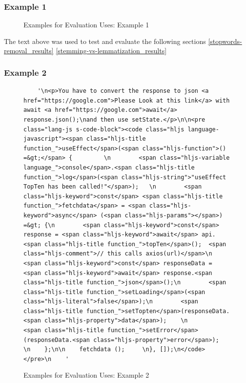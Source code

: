 \subsubsection{Example 1} \label{example-1}
\begin{figure}[H]
  \noindent{}
  \caption{Examples for Evaluation Uses: Example 1}
  \label{fig:example-1}
\end{figure}

\noindent The text above was used to test and evaluate the following sections \ref{stopwords-removal_results} \ref{stemming-vs-lemmatization_results}

\newpage
\subsubsection{Example 2} \label{example-2}
\hspace{0.5cm}
\begin{figure}[H]
  \begin{lstlisting}
    '\n<p>You have to convert the response to json <a href="https://google.com">Please Look at this link</a> with await <a href="https://google.com">await</a> response.json();\nand then use setState.</p>\n\n<pre class="lang-js s-code-block"><code class="hljs language-javascript"><span class="hljs-title function_">useEffect</span>(<span class="hljs-function">() =&gt;</span> {         \n        <span class="hljs-variable language_">console</span>.<span class="hljs-title function_">log</span>(<span class="hljs-string">"useEffect TopTen has been called!"</span>);   \n        <span class="hljs-keyword">const</span> <span class="hljs-title function_">fetchdata</span> = <span class="hljs-keyword">async</span> (<span class="hljs-params"></span>) =&gt; {\n        <span class="hljs-keyword">const</span> response = <span class="hljs-keyword">await</span> api.<span class="hljs-title function_">topTen</span>();  <span class="hljs-comment">// this calls axios(url)</span>\n        <span class="hljs-keyword">const</span> responseData = <span class="hljs-keyword">await</span> response.<span class="hljs-title function_">json</span>();\n        <span class="hljs-title function_">setLoading</span>(<span class="hljs-literal">false</span>);\n        <span class="hljs-title function_">setTopten</span>(responseData.<span class="hljs-property">data</span>);    \n        <span class="hljs-title function_">setError</span>(responseData.<span class="hljs-property">error</span>);    \n    };\n\n    fetchdata ();     \n}, []);\n</code></pre>\n    '
  \end{lstlisting}
  \caption{Examples for Evaluation Uses: Example 2}
  \label{fig:example-2}
\end{figure}


